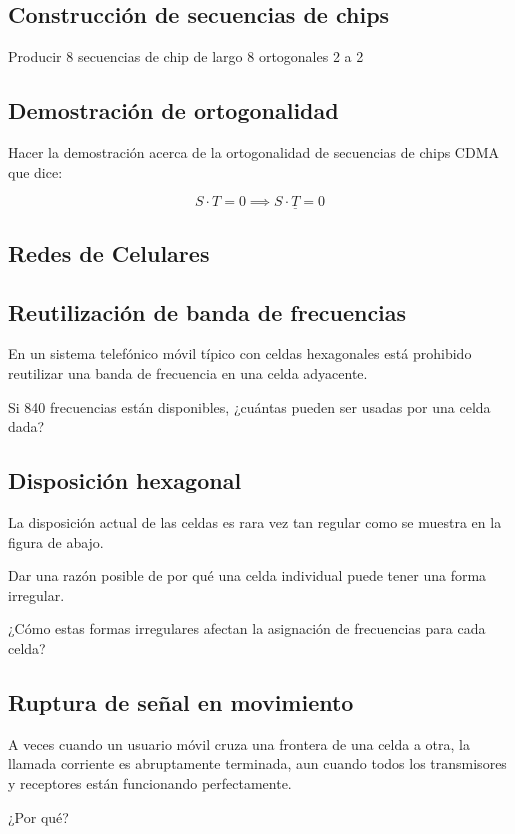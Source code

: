 \documentclass[12pt]{report}
\begin{document}
\begin{exer}
\subsection{Construcción de secuencias de chips \stwo}
Producir 8 secuencias de chip de largo 8 ortogonales 2 a 2
\end{exer}

\begin{exer}
\subsection{Demostración de ortogonalidad \sone \steo \shard}
Hacer la demostración acerca de la ortogonalidad de secuencias de chips CDMA que dice:

$$ S \cdot T = 0 \implies S \cdot \underline{T} = 0 $$
\end{exer}

\begin{exer}
\section{Redes de Celulares}
\subsection{Reutilización de banda de frecuencias \sthree}
En un sistema telefónico móvil típico con celdas hexagonales está prohibido reutilizar una banda de frecuencia en una celda adyacente.

Si 840 frecuencias están disponibles, ¿cuántas pueden ser usadas por una celda dada?
\end{exer}

\begin{exer}
\subsection{Disposición hexagonal \stwo \steo}
La disposición actual de las celdas es rara vez tan regular como se muestra en la figura de abajo.


Dar una razón posible de por qué una celda individual puede tener una forma irregular.

¿Cómo estas formas irregulares afectan la asignación de frecuencias para cada celda?
\end{exer}

\begin{exer}
\subsection{Ruptura de señal en movimiento \sone \steo}
A veces cuando un usuario móvil cruza una frontera de una celda a otra, la llamada
corriente es abruptamente terminada, aun cuando todos los transmisores y receptores están
funcionando perfectamente.

¿Por qué?
\end{exer}
\end{document}
